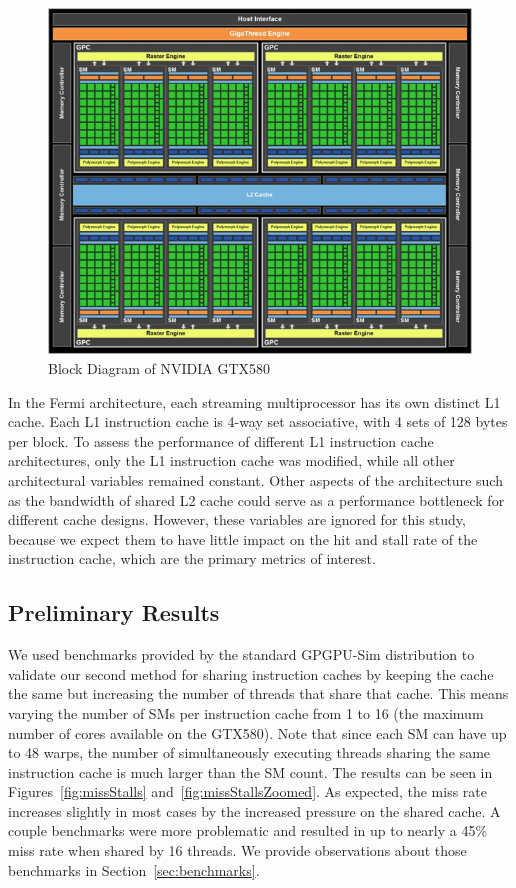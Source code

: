 \begin{figure}[b]
\centering
\includegraphics[width=\columnwidth]{graphics/GTX580.jpg}
\caption{Block Diagram of NVIDIA GTX580~\cite{gf100}}
\label{GTX580}
\end{figure}

In the Fermi architecture, each streaming multiprocessor has
its own distinct L1 cache. 
Each L1 instruction cache is 4-way set associative, with 4 sets of
128 bytes per block. 
To assess the  performance of different L1 instruction cache
architectures, only the L1 instruction cache was modified, while all
other architectural variables remained constant. 
Other aspects of the architecture such as the bandwidth of shared L2
cache could serve as a performance bottleneck for different cache
designs. 
However, these variables are ignored for this study, because we expect
them to have little impact on the hit and stall rate of the
instruction cache, which are the primary metrics of interest.

\subsection{Preliminary Results}

We used benchmarks provided by the standard GPGPU-Sim distribution
to validate our second method for sharing instruction caches by
keeping the cache the same but increasing the number of threads that
share that cache.
This means varying the number of SMs per instruction cache from 1 to
16 (the maximum number of cores available on the GTX580).
Note that since each SM can have up to 48 warps, the number of
simultaneously executing threads sharing the same instruction cache is
much larger than the SM count.
The results can be seen in Figures~\ref{fig:missStalls}
and~\ref{fig:missStallsZoomed}. 
As expected, the miss rate increases slightly in most cases by the
increased pressure on the shared cache.
A couple benchmarks were more problematic and resulted in up to nearly
a 45\% miss rate when shared by 16 threads.
We provide observations about those benchmarks in
Section~\ref{sec:benchmarks}.

